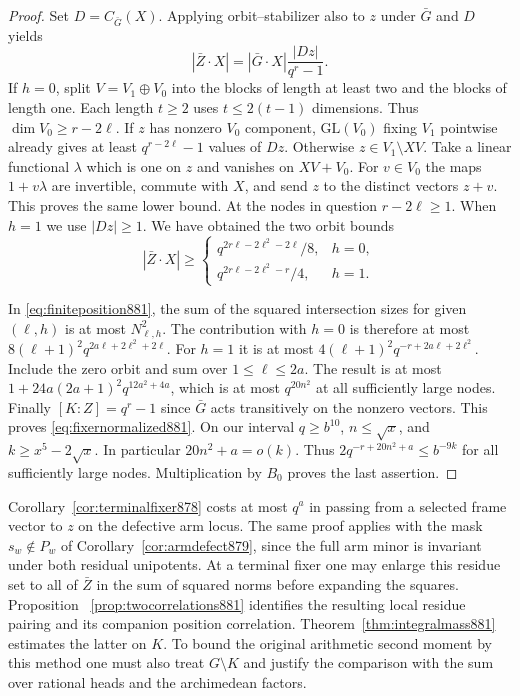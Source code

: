 \documentclass[a4paper,11pt]{article}
\theoremstyle{definition}
\theoremstyle{remark}
\numberwithin{equation}{section}
\begin{document}
\begin{proof}
Set \(D=C_{\bar G}(X)\). Applying orbit--stabilizer also to \(z\)
under \(\bar G\) and \(D\) yields
\[
            |\bar Z\cdot X|
       =|\bar G\cdot X|\frac{|D z|}{q^r-1}.
\]
If \(h=0\), split \(V=V_1\oplus V_0\) into the blocks of length at
least two and the blocks of length one. Each length \(t\ge2\)
uses \(t\le2(t-1)\) dimensions. Thus \(\dim V_0\ge r-2\ell\).
If \(z\) has nonzero \(V_0\) component, \(\mathrm{GL}(V_0)\)
fixing \(V_1\) pointwise already gives at least \(q^{r-2\ell}-1\)
values of \(Dz\). Otherwise \(z\in V_1\setminus XV\). Take a
linear functional \(\lambda\) which is one on \(z\) and vanishes
on \(XV+V_0\). For \(v\in V_0\) the maps
\(1+v\lambda\) are invertible, commute with \(X\), and send \(z\)
to the distinct vectors \(z+v\). This proves the same lower
bound. At the nodes in question \(r-2\ell\ge1\). When \(h=1\)
we use \(|Dz|\ge1\). We have obtained the two orbit bounds
\[
 |\bar Z\cdot X|\ge
 \begin{cases}
 q^{2r\ell-2\ell^2-2\ell}/8,&h=0,\\
 q^{2r\ell-2\ell^2-r}/4,&h=1 .
 \end{cases}
\]

In \eqref{eq:finiteposition881}, the sum of the squared
intersection sizes for given \((\ell,h)\) is at most
\(N_{\ell,h}^2\). The contribution with \(h=0\) is therefore at
most \(8(\ell+1)^2q^{2a\ell+2\ell^2+2\ell}\). For \(h=1\) it
is at most \(4(\ell+1)^2q^{-r+2a\ell+2\ell^2}\). Include the
zero orbit and sum over \(1\le\ell\le2a\). The result is at most
\(1+24a(2a+1)^2q^{12a^2+4a}\), which is at most \(q^{20n^2}\)
at all sufficiently large nodes. Finally \([K:Z]=q^r-1\) since
\(\bar G\) acts transitively on the nonzero vectors.
This proves \eqref{eq:fixernormalized881}. On our interval
\(q\ge b^{10}\), \(n\le\sqrt{x}\), and
\(k\ge x^5-2\sqrt{x}\). In particular \(20n^2+a=o(k)\).
Thus \(2q^{-r+20n^2+a}\le b^{-9k}\) for all sufficiently
large nodes. Multiplication by \(B_0\) proves the last assertion.
\end{proof}

Corollary~\ref{cor:terminalfixer878} costs at most \(q^a\) in
passing from a selected frame vector to \(z\) on the defective
arm locus. The same proof applies with the mask \(s_w\notin P_w\)
of Corollary~\ref{cor:armdefect879}, since the full arm minor
is invariant under both residual unipotents. At a terminal fixer
one may enlarge this residue set to all of \(\bar Z\) in the sum
of squared norms before expanding the squares. Proposition~%
\ref{prop:twocorrelations881} identifies the resulting local
residue pairing and its companion position correlation.
Theorem~\ref{thm:integralmass881} estimates the latter on \(K\).
To bound the original arithmetic second moment by this method
one must also treat \(G\setminus K\) and justify the comparison
with the sum over rational heads and the archimedean factors.
\clearpage
\end{document}
